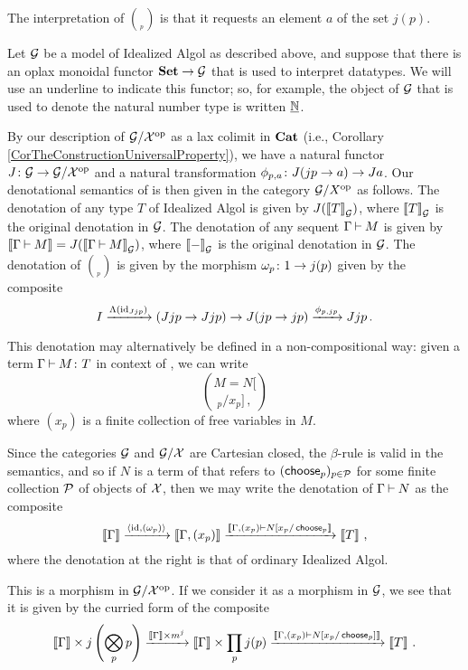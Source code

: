 The interpretation of $\choose_p$ is that it requests an element $a$ of the set $j(p)$.

Let $\G$ be a model of Idealized Algol as described above, and suppose that there is an oplax monoidal functor $\Set \to \G$ that is used to interpret datatypes.  
We will use an underline to indicate this functor; so, for example, the object of $\G$ that is used to denote the natural number type is written $\ul\bN$.

By our description of $\G/\oppcat \X$ as a lax colimit in $\Cat$ (i.e., Corollary \ref{CorTheConstructionUniversalProperty}), we have a natural functor $J\from \G\to\G/\oppcat \X$ and a natural transformation $\phi_{p,a}\from J(jp\to a) \to Ja$.  
Our denotational semantics of \IAXX is then given in the category $\G/\oppcat X$ as follows.  
The denotation of any type $T$ of Idealized Algol is given by $J(\deno{T}_\G)$, where $\deno{T}_\G$ is the original denotation in $\G$.
The denotation of any sequent $\Gamma\ts M$ is given by $\deno{\Gamma\ts M} = J(\deno{\Gamma\ts M}_\G)$, where $\deno{-}_\G$ is the original denotation in $\G$.
The denotation of $\choose_p$ is given by the morphism $\omega_p \from 1 \to j(p)$ given by the composite
\[
  I \xrightarrow{\Lambda(\id_{Jjp})} (Jjp \to Jjp)  \to J(jp \to jp) \xrightarrow{\phi_{p,jp}} Jjp\,.
  \]

This denotation may alternatively be defined in a non-compositional way: given a term $\Gamma\ts M\from T$ in context of \IAXX, we can write
\[
  M = N[\choose_p/x_p]\,,
  \]
where $(x_p)$ is a finite collection of free variables in $M$.

Since the categories $\G$ and $\G/\X$ are Cartesian closed, the $\beta$-rule is valid in the semantics, and so if $N$ is a term of \IAXX that refers to $(\choose_p)_{p\in\P}$ for some finite collection $\P$ of objects of $\X$, then we may write the denotation of $\Gamma \ts N$ as the composite
\[
  \deno{\Gamma} \xrightarrow{\langle \id,(\omega_p)\rangle} \deno{\Gamma,(x_p)} \xrightarrow{\deno{\Gamma,(x_p)\ts N[x_p/\choose_p}} \deno{T}\,,
  \]
where the denotation at the right is that of ordinary Idealized Algol.

This is a morphism in $\G/\oppcat\X$.  
If we consider it as a morphism in $\G$, we see that it is given by the curried form of the composite
\[
  \deno{\Gamma}\times j\left(\Tensor_p p\right) \xrightarrow{\deno{\Gamma}\times m^j} \deno \Gamma \times \prod_p j(p) \xrightarrow{\deno{\Gamma,(x_p)\ts N[x_p/\choose_p]}} \deno T\,.
  \]

